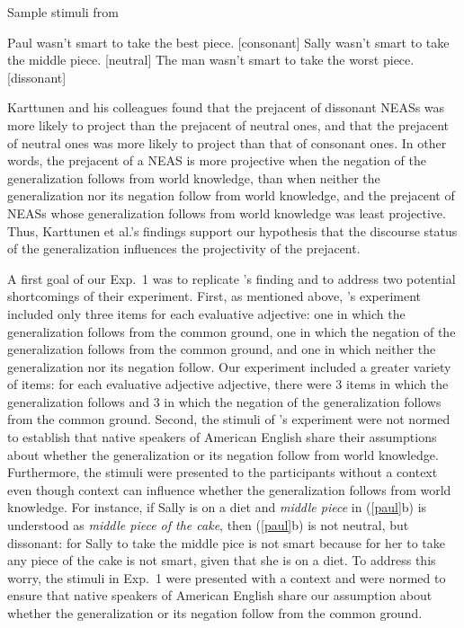 \documentclass[11pt,fleqn]{article}
\newcommand{\6}{\mbox{$[\hspace*{-.6mm}[$}}
\newcommand{\9}{\mbox{$]\hspace*{-.6mm}]$}}
\newcommand{\citepos}[1]{\citeauthor{#1}'s \citeyear{#1}}
\begin{document}
\begin{exe}
\ex\label{paul} Sample stimuli from \citealt[241]{karttunen-etal2014}
\begin{xlist}
\ex Paul wasn't smart to take the best piece. \hfill [consonant]
\ex Sally wasn't smart to take the middle piece.  \hfill [neutral]
\ex The man wasn't smart to take the worst piece. \hfill [dissonant]
\end{xlist}
\end{exe}

Karttunen and his colleagues found that the prejacent of dissonant NEASs was more likely to project than the prejacent of neutral ones, and that the prejacent of neutral ones was more likely to project than that of consonant ones. In other words, the prejacent of a NEAS is more projective when the negation of the generalization follows from world knowledge, than when neither the generalization nor its negation follow from world knowledge, and the prejacent of NEASs whose generalization follows from world knowledge was least projective. Thus, Karttunen et al.'s findings support our hypothesis that the discourse status of the generalization influences the projectivity of the prejacent.

A first goal of our Exp.~1 was to replicate \citepos{karttunen-etal2014} finding and to address two potential shortcomings of their experiment. First, as mentioned above, \citepos{karttunen-etal2014} experiment included only three items for each evaluative adjective: one in which the generalization follows from the common ground, one in which the negation of the generalization follows from the common ground, and one in which neither the generalization nor its negation follow. Our experiment included a greater variety of items: for each evaluative adjective adjective, there were 3 items in which the generalization follows and 3 in which the negation of the generalization follows from the common ground. Second, the stimuli of  \citepos{karttunen-etal2014} experiment were not normed to establish that native speakers of American English share their assumptions about whether the generalization or its negation follow from world knowledge. Furthermore, the stimuli were
presented to the participants without a context even though context can influence whether the generalization follows from world knowledge. For instance, if Sally is on a diet and {\em middle piece} in (\ref{paul}b) is understood as {\em middle piece of the cake}, then (\ref{paul}b) is not neutral, but dissonant: for Sally to take the middle pice is not smart because for her to take any piece of the cake is not smart, given that she is on a diet. To address this worry, the stimuli in Exp.~1 were presented with a context and were normed to ensure that native speakers of American English share our assumption about whether the generalization or its negation follow from the common ground.
\end{document}
